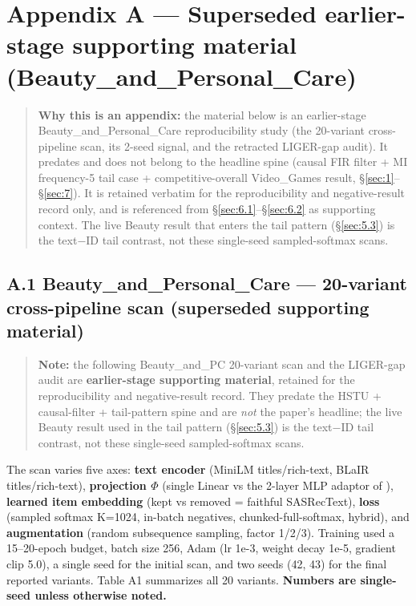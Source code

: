 \section*{Appendix A --- Superseded earlier-stage supporting material (Beauty\_and\_\allowbreak Personal\_Care)}

\begin{quote}
\textbf{Why this is an appendix:} the material below is an earlier-stage Beauty\_and\_\allowbreak Personal\_Care reproducibility study (the 20-variant cross-pipeline scan, its 2-seed signal, and the retracted LIGER-gap audit). It predates and does not belong to the headline spine (causal FIR filter + MI frequency-5 tail case + competitive-overall Video\_Games result, \S\ref{sec:1}--\S\ref{sec:7}). It is retained verbatim for the reproducibility and negative-result record only, and is referenced from \S\ref{sec:6.1}--\S\ref{sec:6.2} as supporting context. The live Beauty result that enters the tail pattern (\S\ref{sec:5.3}) is the text\ensuremath{-}ID tail contrast, not these single-seed sampled-softmax scans.
\end{quote}


\subsection*{A.1 Beauty\_and\_\allowbreak Personal\_Care --- 20-variant cross-pipeline scan (superseded supporting material)}

\begin{quote}
\textbf{Note:} the following Beauty\_and\_\allowbreak PC 20-variant scan and the LIGER-gap audit are \textbf{earlier-stage supporting material}, retained for the reproducibility and negative-result record. They predate the HSTU + causal-filter + tail-pattern spine and are \emph{not} the paper's headline; the live Beauty result used in the tail pattern (\S\ref{sec:5.3}) is the text\ensuremath{-}ID tail contrast, not these single-seed sampled-softmax scans.
\end{quote}

The scan varies five axes: \textbf{text encoder} (MiniLM titles/rich-text, BLaIR titles/rich-text), \textbf{projection \ensuremath{\Phi}} (single Linear vs the 2-layer MLP adaptor of \citealp{hou2024blair}), \textbf{learned item embedding} (kept vs removed = faithful SASRecText), \textbf{loss} (sampled softmax K=1024, in-batch negatives, chunked-full-softmax, hybrid), and \textbf{augmentation} (random subsequence sampling, factor 1/2/3). Training used a 15--20-epoch budget, batch size 256, Adam (lr 1e-3, weight decay 1e-5, gradient clip 5.0), a single seed for the initial scan, and two seeds (42, 43) for the final reported variants. Table A1 summarizes all 20 variants. \textbf{Numbers are single-seed unless otherwise noted.}

